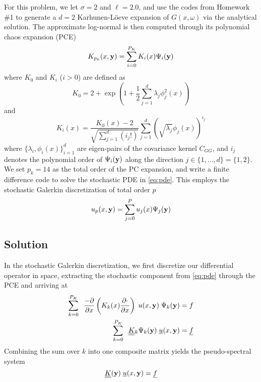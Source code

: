 \documentclass[11pt]{article}
\begin{document}
For this problem, we let $\sigma = 2$ and $\ell = 2.0$, and use the codes from Homework \#1 to generate a $d=2$ Karhunen-L\"oeve expansion of $G(x,\omega)$ via the analytical solution. The approximate log-normal is then computed through its polynomial chaos expansion (PCE)
\begin{equation}
K_{p_k}(x,\mb{y}) = \sum_{i=0}^{P_K} K_i(x) \Psi_i(\mb{y})
\end{equation}
where $K_0$ and $K_i$ ($i>0$) are defined as
\begin{equation}
K_0 = 2 + \exp \left( 1 + \frac{1}{2} \sum_{j=1}^d \lambda_j \phi_j^2(x) \right)
\end{equation}
and
\begin{equation}
K_i(x) = \frac{K_0(x) - 2}{\sqrt{\sum_{j=1}^d (i_j!)}} \sum_{j=1}^d \left( \sqrt{\lambda_j} \phi_j(x) \right)^{i_j}
\end{equation}
where $\{ \lambda_i, \phi_i(x) \}_{i=1}^d$ are eigen-pairs of the covariance kernel $C_{GG}$, and $i_j$ denotes the polynomial order of $\Psi_i(\mb{y})$ along the direction $j \in \{1, \dots, d\} = \{1,2\}$. We set $p_k = 14$ as the total order of the PC expansion, and write a finite difference code to solve the stochastic PDE in \eqref{eq:pde}. This employs the stochastic Galerkin discretization of total order $p$
\begin{equation}
u_p(x,\mb{y}) = \sum_{j=0}^{P} u_j(x) \Psi_j(\mb{y})
\label{eq:galerkin_discretization}
\end{equation}

\subsection*{Solution}

In the stochastic Galerkin discretization, we first discretize our differential operator in space, extracting the stochastic component from \eqref{eq:pde} through the PCE and arriving at
\begin{align}
\sum_{k=0}^{P_K}
\;\;
\frac{-\partial}{\partial x} \left(K_k(x) \pp{\cdot}{x} \right)
\;
u(x,\mb{y})
\;
\Psi_k(\mb{y})
&=
f
\\
\sum_{k=0}^{P_K}
\;\;
\uul{K}_k
\Psi_k(\mb{y})
\;
\ul{u}(x,\mb{y})
&=
\ul{f}
\end{align}
Combining the sum over $k$ into one composite matrix yields the pseudo-spectral system
\begin{equation}
\uul{K}(\mb{y}) \; \ul{u}(x,\mb{y}) = \ul{f}
\end{equation}
\end{document}

